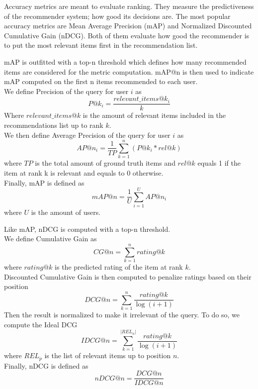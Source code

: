 Accuracy metrics are meant to evaluate ranking. They measure the predictiveness of the recommender system; how good its decisions are. The most popular accuracy metrics are Mean Average Precision (mAP) and Normalized Discounted Cumulative Gain (nDCG). Both of them evaluate how good the recommender is to put the most relevant items first in the recommendation list.\par
mAP is outfitted with a top-n threshold which defines how many recommended items are considered for the metric computation. mAP@n is then used to indicate mAP computed on the first n items recommended to each user.\\
We define Precision of the query for user $i$ as
\begin{equation*}
P@k_i = \frac{relevant\_items@k_i}{k}
\end{equation*}
Where $relevant\_items@k$ is the amount of relevant items included in the recommendations list up to rank $k$.\\
We then define Average Precision of the query for user $i$ as
\begin{equation*}
AP@n_i = \frac{1}{TP} \sum_{k=1}^{n} (P@k_i * rel@k)
\end{equation*}
where $TP$ is the total amount of ground truth items and $rel@k$ equals 1 if the item at rank k is relevant and equals to 0 otherwise.\\
Finally, mAP is defined as
\begin{equation*}
mAP@n = \frac{1}{U} \sum_{i=1}^{U} AP@n_i
\end{equation*}
where $U$ is the amount of users.\par
Like mAP, nDCG is computed with a top-n threshold.\\
We define Cumulative Gain as
\begin{equation*}
CG@n = \sum_{k=1}^{n} rating@k
\end{equation*}
where $rating@k$ is the predicted rating of the item at rank $k$.\\
Discounted Cumulative Gain is then computed to penalize ratings based on their position
\begin{equation*}
DCG@n = \sum_{k=1}^{n} \frac{rating@k}{\log(i+1)}
\end{equation*}
Then the result is normalized to make it irrelevant of the query. To do so, we compute the Ideal DCG
\begin{equation*}
IDCG@n = \sum_{k=1}^{|REL_n|} \frac{rating@k}{\log(i+1)}
\end{equation*}
where $REL_p$ is the list of relevant items up to position $n$.\\
Finally, nDCG is defined as
\begin{equation*}
nDCG@n = \frac{DCG@n}{IDCG@n}
\end{equation*}


